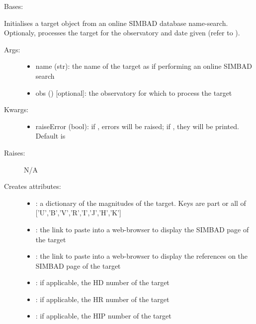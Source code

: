 \documentclass[letterpaper,10pt,english]{sphinxmanual}
\begin{document}
\begin{fulllineitems}
\label{astroobs:astroobs.TargetSIMBAD.TargetSIMBAD}
Bases: 

Initialises a target object from an online SIMBAD database name-search. Optionaly, processes the target for the observatory and date given (refer to ).
\begin{description}
\item[{Args:}] \leavevmode\begin{itemize}
\item {} 
name (str): the name of the target as if performing an online SIMBAD search

\item {} 
obs () {[}optional{]}: the observatory for which to process the target

\end{itemize}

\item[{Kwargs:}] \leavevmode\begin{itemize}
\item {} 
raiseError (bool): if , errors will be raised; if , they will be printed. Default is 

\end{itemize}

\item[{Raises:}] \leavevmode
N/A

\item[{Creates attributes:}] \leavevmode\begin{itemize}
\item {} 
: a dictionary of the magnitudes of the target. Keys are part or all of {[}'U','B','V','R','I','J','H','K'{]}

\item {} 
: the link to paste into a web-browser to display the SIMBAD page of the target

\item {} 
: the link to paste into a web-browser to display the references on the SIMBAD page of the target

\item {} 
: if applicable, the HD number of the target

\item {} 
: if applicable, the HR number of the target

\item {} 
: if applicable, the HIP number of the target

\end{itemize}

\end{description}

\end{fulllineitems}
\end{document}
